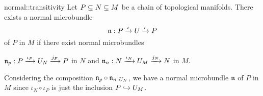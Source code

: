 \begin{mylemma}{normal::transitivity}
    Let $P \sub N \sub M$ be a chain of topological manifolds.
    There exists a normal microbundle
    \[ \bundledef{\bn}{P}{U}{\iota}{r} \]
    of $P$ in $M$ if there exist normal microbundles
    \begin{center}
        $\bundledef{\bn_p}{P}{U_N}{\iota_P}{j_P}$ in $N$ and $\bundledef{\bn_n}{N}{U_M}{\iota_N}{j_N}$ in $M$.
    \end{center}
\end{mylemma}

\begin{myproof}
    Considering the composition $\bn_p \circ \bn_n\restr{U_N}$,
    we have a normal microbundle $\bn$ of $P$ in $M$
    since $\iota_N \circ \iota_P$ is just the inclusion $P \incl U_M$.
\end{myproof}